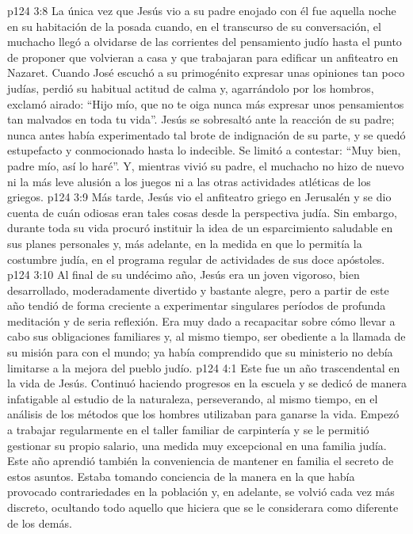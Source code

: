 \vs p124 3:8 La única vez que Jesús vio a su padre enojado con él fue aquella noche en su habitación de la posada cuando, en el transcurso de su conversación, el muchacho llegó a olvidarse de las corrientes del pensamiento judío hasta el punto de proponer que volvieran a casa y que trabajaran para edificar un anfiteatro en Nazaret. Cuando José escuchó a su primogénito expresar unas opiniones tan poco judías, perdió su habitual actitud de calma y, agarrándolo por los hombros, exclamó airado: “Hijo mío, que no te oiga nunca más expresar unos pensamientos tan malvados en toda tu vida”. Jesús se sobresaltó ante la reacción de su padre; nunca antes había experimentado tal brote de indignación de su parte, y se quedó estupefacto y conmocionado hasta lo indecible. Se limitó a contestar: “Muy bien, padre mío, así lo haré”. Y, mientras vivió su padre, el muchacho no hizo de nuevo ni la más leve alusión a los juegos ni a las otras actividades atléticas de los griegos.
\vs p124 3:9 Más tarde, Jesús vio el anfiteatro griego en Jerusalén y se dio cuenta de cuán odiosas eran tales cosas desde la perspectiva judía. Sin embargo, durante toda su vida procuró instituir la idea de un esparcimiento saludable en sus planes personales y, más adelante, en la medida en que lo permitía la costumbre judía, en el programa regular de actividades de sus doce apóstoles.
\vs p124 3:10 Al final de su undécimo año, Jesús era un joven vigoroso, bien desarrollado, moderadamente divertido y bastante alegre, pero a partir de este año tendió de forma creciente a experimentar singulares períodos de profunda meditación y de seria reflexión. Era muy dado a recapacitar sobre cómo llevar a cabo sus obligaciones familiares y, al mismo tiempo, ser obediente a la llamada de su misión para con el mundo; ya había comprendido que su ministerio no debía limitarse a la mejora del pueblo judío.
\vs p124 4:1 Este fue un año trascendental en la vida de Jesús. Continuó haciendo progresos en la escuela y se dedicó de manera infatigable al estudio de la naturaleza, perseverando, al mismo tiempo, en el análisis de los métodos que los hombres utilizaban para ganarse la vida. Empezó a trabajar regularmente en el taller familiar de carpintería y se le permitió gestionar su propio salario, una medida muy excepcional en una familia judía. Este año aprendió también la conveniencia de mantener en familia el secreto de estos asuntos. Estaba tomando conciencia de la manera en la que había provocado contrariedades en la población y, en adelante, se volvió cada vez más discreto, ocultando todo aquello que hiciera que se le considerara como diferente de los demás.
